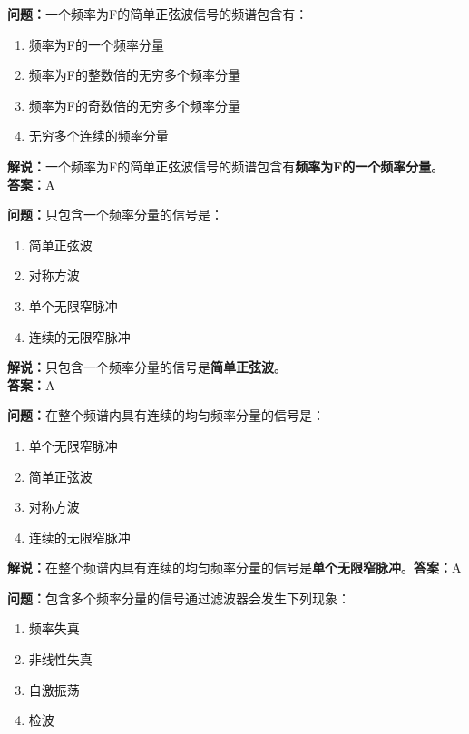 \textbf{问题：}一个频率为F的简单正弦波信号的频谱包含有：

\begin{enumerate}[label=\Alph*), leftmargin=1.5cm]
	\item 频率为F的一个频率分量
	\item 频率为F的整数倍的无穷多个频率分量
	\item 频率为F的奇数倍的无穷多个频率分量
	\item 无穷多个连续的频率分量
\end{enumerate}

\textbf{解说：}一个频率为F的简单正弦波信号的频谱包含有\textbf{频率为F的一个频率分量}。\\\textbf{答案：}A%



\textbf{问题：}只包含一个频率分量的信号是：
\begin{enumerate}[label=\Alph*), leftmargin=1.5cm]
	\item 简单正弦波
	\item 对称方波
	\item 单个无限窄脉冲
	\item 连续的无限窄脉冲
\end{enumerate}

\textbf{解说：}只包含一个频率分量的信号是\textbf{简单正弦波}。\\\textbf{答案：}A%



\textbf{问题：}在整个频谱内具有连续的均匀频率分量的信号是：

\begin{enumerate}[label=\Alph*), leftmargin=1.5cm]
	\item 单个无限窄脉冲
	\item 简单正弦波
	\item 对称方波
	\item 连续的无限窄脉冲
\end{enumerate}

\textbf{解说：}在整个频谱内具有连续的均匀频率分量的信号是\textbf{单个无限窄脉冲}。\textbf{答案：}A%



\textbf{问题：}包含多个频率分量的信号通过滤波器会发生下列现象：

\begin{enumerate}[label=\Alph*), leftmargin=1.5cm]
	\item 频率失真
	\item 非线性失真
	\item 自激振荡
	\item 检波
\end{enumerate}

